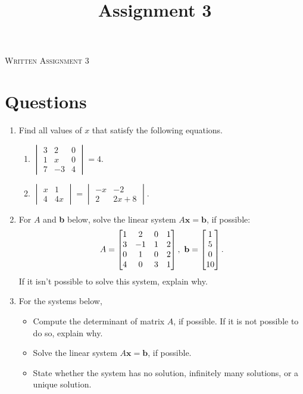 \documentclass{article}
\title{Assignment 3}
\date{}
\begin{document}
\begin{center}
\textsc{\LARGE Written Assignment 3}\\[0.5cm]
\end{center}

\section*{Questions}

\begin{enumerate}
\item

Find all values of $x$ that satisfy the following equations.

\begin{enumerate}
\item \(
 \begin{vmatrix}
  3 &  2 &  0 \\
  1 &  x &  0 \\
  7 & -3 &  4
 \end{vmatrix} = 4.
\)
\item \(
 \begin{vmatrix}
  x & 1 \\
  4 & 4x
 \end{vmatrix} = \begin{vmatrix}
  -x & -2 \\
  2 & 2x + 8
 \end{vmatrix}
\).
\end{enumerate}

\item
For $A$ and \textbf{b} below, solve the linear system $A\mathbf{x} = \mathbf{b}$, if possible:
\begin{align*}
 A = \BM
  1 & 2 & 0 & 1 \\
  3 & -1 & 1 & 2 \\
  0 & 1 & 0 & 2 \\
  4 & 0 & 3 & 1
 \EM, \ 
 \mathbf{b} = \BM 1 \\ 5 \\ 0 \\ 10 \EM.
\end{align*}
 If it isn't possible to solve this system, explain why. 

\item
For the systems below,
\begin{itemize}
\item Compute the determinant of matrix $A$, if possible. If it is not possible to do so, explain why. 
\item Solve the linear system $A\mathbf{x} = \mathbf{b}$, if possible. 
\item State whether the system has no solution, infinitely many solutions, or a unique solution.
\end{itemize}


\end{enumerate}
\end{document}
